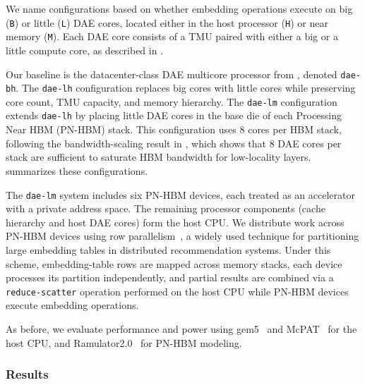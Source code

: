 We name configurations based on whether embedding operations execute on big (\texttt{B}) or little (\texttt{L}) DAE cores, located either in the host processor (\texttt{H}) or near memory (\texttt{M}). Each DAE core consists of a TMU paired with either a big or a little compute core, as described in .

Our baseline is the datacenter-class DAE multicore processor from , denoted \texttt{dae-bh}. The \texttt{dae-lh} configuration replaces big cores with little cores while preserving core count, TMU capacity, and memory hierarchy. The \texttt{dae-lm} configuration extends \texttt{dae-lh} by placing little DAE cores in the base die of each Processing Near HBM (PN-HBM) stack. This configuration uses 8 cores per HBM stack, following the bandwidth-scaling result in , which shows that 8 DAE cores per stack are sufficient to saturate HBM bandwidth for low-locality layers.  summarizes these configurations.

The \texttt{dae-lm} system includes six PN-HBM devices, each treated as an accelerator with a private address space. The remaining processor components (cache hierarchy and host DAE cores) form the host CPU. We distribute work across PN-HBM devices using row parallelism~\cite{mudigere2022isca}, a widely used technique for partitioning large embedding tables in distributed recommendation systems. Under this scheme, embedding-table rows are mapped across memory stacks, each device processes its partition independently, and partial results are combined via a \texttt{reduce-scatter} operation performed on the host CPU while PN-HBM devices execute embedding operations.

As before, we evaluate performance and power using gem5~\cite{lowepower2020gem5} and McPAT~\cite{li2009micro} for the host CPU, and Ramulator2.0~\cite{luo2024cal} for PN-HBM modeling.

\subsubsection{Results} \label{sec:specialized-dae-results}

